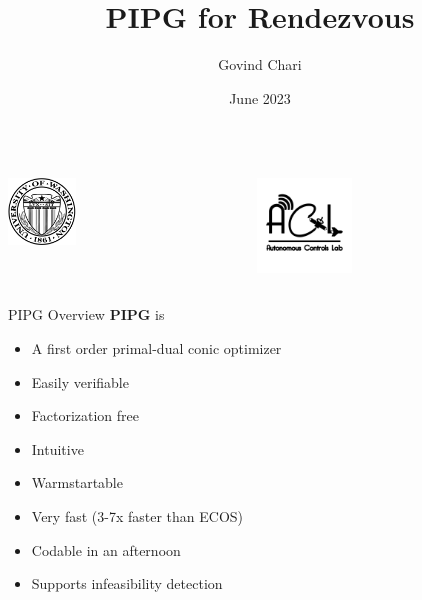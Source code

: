\documentclass[aspectratio=169]{beamer}
\title{PIPG for Rendezvous}
\author{Govind Chari}
\date{June 2023}
\institute{University of Washington}
\begin{document}
\begin{frame}
\titlepage
\begin{columns}
\begin{column}[c]{0.5\linewidth}
\begin{center}
\includegraphics[width=1.8cm]{img/seal_black.pdf}
\end{center}
\end{column}
\begin{column}[c]{0.5\linewidth}
\begin{center}
    \vspace{0.25cm}
\includegraphics[height=2.5cm]{img/ACL_logo.png}    
\end{center}
\end{column}
\end{columns}
\end{frame}

\logo{}

\begin{frame}{PIPG Overview}
    \textbf{PIPG} is
    \begin{itemize}
        \item A first order primal-dual conic optimizer
        \item Easily verifiable
        \item Factorization free
        \item Intuitive
        \item Warmstartable
        \item Very fast (3-7x faster than ECOS)
        \item Codable in an afternoon
        \item Supports infeasibility detection
    \end{itemize}
\end{frame}
\end{document}
